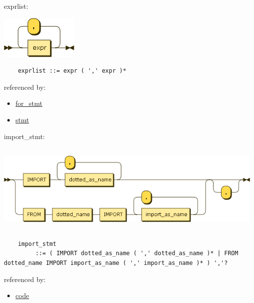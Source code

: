 \begin{minipage}{\textwidth}
    \protect\hypertarget{exprlist}{}{exprlist:}

    \includegraphics[width=1.50000in,height=0.83333in]{diagram/exprlist.png}

    \begin{verbatim}
    exprlist ::= expr ( ',' expr )*
    \end{verbatim}

    referenced by:

    \begin{itemize}
            \tightlist
        \item
            \protect\hyperlink{for_stmt}{for\_stmt}
        \item
            \protect\hyperlink{stmt}{stmt}
    \end{itemize}

\end{minipage}

\begin{minipage}{\textwidth}
    \protect\hypertarget{import_stmt}{}{import\_stmt:}

    \includegraphics[width=6.50000in,height=1.75000in]{diagram/import_stmt.png}

    \begin{verbatim}
    import_stmt
         ::= ( IMPORT dotted_as_name ( ',' dotted_as_name )* | FROM dotted_name IMPORT import_as_name ( ',' import_as_name )* ) ','?
    \end{verbatim}

    referenced by:

    \begin{itemize}
            \tightlist
        \item
            \protect\hyperlink{code}{code}
    \end{itemize}

\end{minipage}


